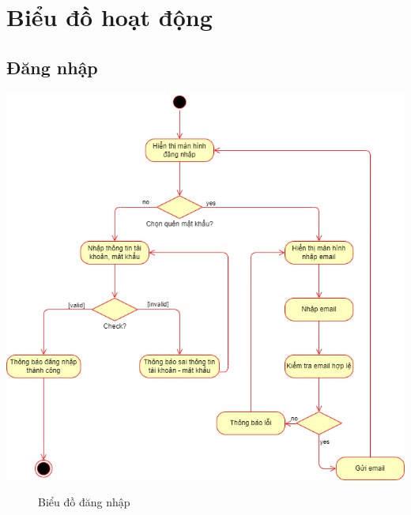 \section{Biểu đồ hoạt động}
\subsection{Đăng nhập}
  \begin{center}
    \includegraphics[width=1.1\textwidth]{../drawio/activity/login.png}
    \begin{figure}[h]
      \centering
      \caption{Biểu đồ đăng nhập}
    \end{figure}
  \end{center}
